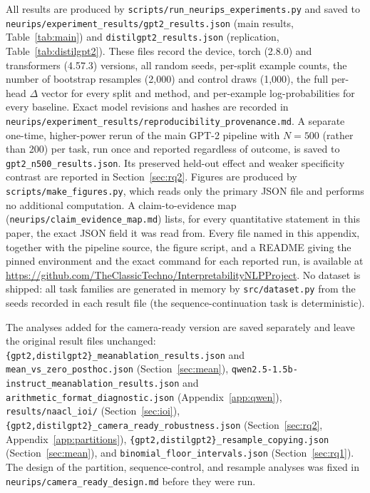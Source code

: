 \documentclass{article}
\begin{document}
All results are produced by \texttt{scripts/run\_neurips\_experiments.py}
and saved to \texttt{neurips/experiment\_results/gpt2\_results.json}
(main results, Table~\ref{tab:main}) and \texttt{distilgpt2\_results.json}
(replication, Table~\ref{tab:distilgpt2}). These files record the device,
torch (2.8.0) and transformers (4.57.3) versions, all random seeds,
per-split example counts, the number of bootstrap
resamples (2{,}000) and control draws (1{,}000), the full per-head
$\Delta$ vector for every split and method, and per-example
log-probabilities for every baseline. Exact model revisions and hashes
are recorded in
\texttt{neurips/experiment\_results/reproducibility\_provenance.md}. A separate
one-time, higher-power
rerun of the main GPT-2 pipeline with $N{=}500$ (rather than 200) per
task, run once and reported regardless of outcome, is saved to
\texttt{gpt2\_n500\_results.json}. Its preserved held-out effect and
weaker specificity contrast are reported in
Section~\ref{sec:rq2}. Figures are produced by
\texttt{scripts/make\_figures.py}, which reads only the primary JSON
file and performs no additional computation. A claim-to-evidence map
(\texttt{neurips/claim\_evidence\_map.md}) lists, for every quantitative
statement in this paper, the exact JSON field it was read from. Every file
named in this appendix, together with the pipeline source, the figure script,
and a README giving the pinned environment and the exact command for each
reported run, is available at
\url{https://github.com/TheClassicTechno/InterpretabilityNLPProject}. No dataset
is shipped: all task families are generated in memory by
\texttt{src/dataset.py} from the seeds recorded in each result file
(the sequence-continuation task is deterministic).

The analyses added for the camera-ready version are saved separately and
leave the original result files unchanged:
\texttt{\{gpt2,distilgpt2\}\_meanablation\_results.json} and
\texttt{mean\_vs\_zero\_posthoc.json} (Section~\ref{sec:mean}),
\texttt{qwen2.5-1.5b-instruct\_meanablation\_results.json} and
\texttt{arithmetic\_format\_diagnostic.json} (Appendix~\ref{app:qwen}),
\texttt{results/naacl\_ioi/} (Section~\ref{sec:ioi}),
\texttt{\{gpt2,distilgpt2\}\_camera\_ready\_robustness.json}
(Section~\ref{sec:rq2}, Appendix~\ref{app:partitions}),
\texttt{\{gpt2,distilgpt2\}\_resample\_copying.json}
(Section~\ref{sec:mean}), and \texttt{binomial\_floor\_intervals.json}
(Section~\ref{sec:rq1}). The design of the
partition, sequence-control, and resample analyses was fixed in
\texttt{neurips/camera\_ready\_design.md} before they were run.

\newpage

\end{document}
